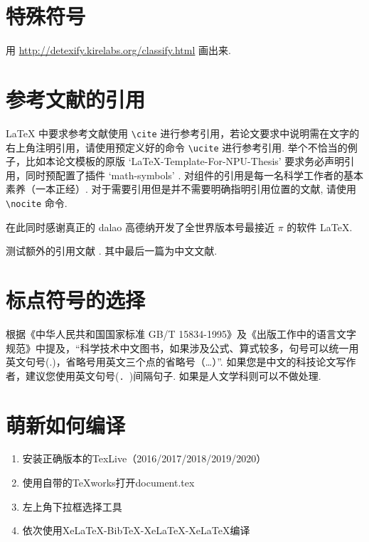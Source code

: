 \section{特殊符号}

用 \href{http://detexify.kirelabs.org/classify.html}{http://detexify.kirelabs.org/classify.html}
画出来.

\section{参考文献的引用}

\LaTeX{} 中要求参考文献使用 \lstinline`\cite` 进行参考引用，若论文要求中说明需在文字的右上角注明引用，请使用预定义好的命令 \lstinline`\ucite` 进行参考引用. 举个不恰当的例子，比如本论文模板的原版 `LaTeX-Template-For-NPU-Thesis'  要求务必声明引用，同时预配置了插件 `math-symbols' . 对组件的引用是每一名科学工作者的基本素养（一本正经）. 对于需要引用但是并不需要明确指明引用位置的文献, 请使用 \lstinline`\nocite` 命令.

在此同时感谢真正的 dalao 高德纳开发了全世界版本号最接近 $\pi$ 的软件 \LaTeX{}\nocite{lamport1989latex}.

测试额外的引用文献 . 其中最后一篇为中文文献.

\section{标点符号的选择}

根据《中华人民共和国国家标准 GB/T 15834-1995》及《出版工作中的语言文字规范》中提及，“科学技术中文图书，如果涉及公式、算式较多，句号可以统一用英文句号(.)，省略号用英文三个点的省略号（…）”. 如果您是中文的科技论文写作者，建议您使用英文句号(\lstinline`. `)间隔句子. 如果是人文学科则可以不做处理.

\section{萌新如何编译}

\begin{enumerate}
    \setlength{\itemsep}{0pt}
    \item 安装正确版本的TexLive（2016/2017/2018/2019/2020）
    \item 使用自带的TeXworks打开document.tex
    \item 左上角下拉框选择工具
    \item 依次使用XeLaTeX-BibTeX-XeLaTeX-XeLaTeX编译
\end{enumerate}

\endinput
